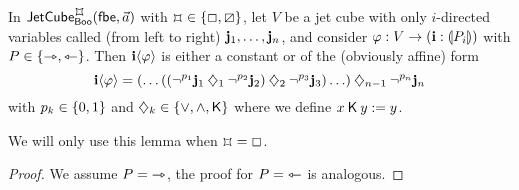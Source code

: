 \documentclass[a4paper]{memoir}
\begin{document}
\begin{lemma} \label{thm:char-twisted-cube-to-line}
	In $\jetcubetri \mycubex \booleanalg {\vec a}$ with $\mycubex \in \accol{\affine, \cartes}$, let $V$ be a jet cube with only $i$-directed variables called (from left to right) $\mathbf{j}_1, \ldots, \mathbf{j}_n$, and consider $\varphi : V \to (\mathbf{i} : {\llparenthesis P_i \rrparenthesis})$ with $P \in \mathopen{}\left\{ \rightarrowtriangle, \leftarrowtriangle \right\}\mathclose{}$.
	Then $\mathbf{i} \langle \varphi \rangle$ is either a constant or of the (obviously affine) form
	\[
		\mathbf{i} \langle \varphi \rangle = (\ldots((\lnot^{p_1} \mathbf{j}_1 \mathbin{\diamondsuit}_1 \lnot^{p_2} \mathbf{j}_2) \mathbin{\diamondsuit}_2 \lnot^{p_3} \mathbf{j}_3) \ldots) \mathbin{\diamondsuit}_{n-1} \lnot^{p_n} \mathbf{j}_n
	\]
	with $p_k \in \mathopen{}\left\{ 0, 1 \right\}\mathclose{}$ and $\mathbin{\diamondsuit}_k \in \mathopen{}\left\{ {\vee}, {\wedge}, {\mathbin{\mathsf{K}}} \right\}\mathclose{}$ where we define $x \mathbin{\mathsf{K}} y := y$.
\end{lemma}
We will only use this lemma when $\mycubex = \affine$.
\begin{proof}
%
	We assume $P = {\rightarrowtriangle}$, the proof for $P = {\leftarrowtriangle}$ is analogous.


\end{proof}
\end{document}
